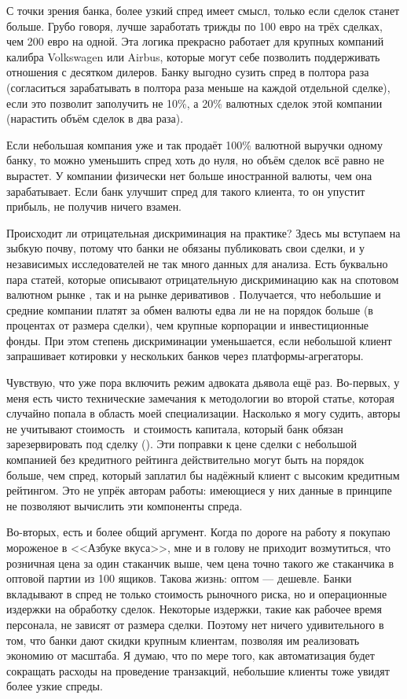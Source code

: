 С точки зрения банка, более узкий спред имеет смысл, только если сделок станет
больше. Грубо говоря, лучше заработать трижды по 100 евро на трёх сделках, чем
200 евро на одной. Эта логика прекрасно работает для крупных компаний калибра
Volkswagen или Airbus, которые могут себе позволить поддерживать отношения с
десятком дилеров. Банку выгодно сузить спред в полтора раза (согласиться
зарабатывать в полтора раза меньше на каждой отдельной сделке), если это
позволит заполучить не 10\%, а 20\% валютных сделок этой компании (нарастить
объём сделок в два раза).

Если небольшая компания уже и так продаёт 100\% валютной выручки одному банку,
то можно уменьшить спред хоть до нуля, но объём сделок всё равно не вырастет. У
компании физически нет больше иностранной валюты, чем она зарабатывает. Если
банк улучшит спред для такого клиента, то он упустит прибыль, не получив ничего
взамен.

Происходит ли отрицательная дискриминация на практике? Здесь мы вступаем на
зыбкую почву, потому что банки не обязаны публиковать свои сделки, и у
независимых исследователей не так много данных для анализа. Есть буквально пара
статей, которые описывают отрицательную дискриминацию как на спотовом валютном
рынке \cite{bjonnes2017}, так и на рынке деривативов \cite{hau2019}. Получается,
что небольшие и средние компании платят за обмен валюты едва ли не на порядок
больше (в процентах от размера сделки), чем крупные корпорации и инвестиционные
фонды. При этом степень дискриминации уменьшается, если небольшой клиент
запрашивает котировки у нескольких банков через платформы-агрегаторы.

Чувствую, что уже пора включить режим адвоката дьявола ещё раз. Во-первых, у
меня есть чисто технические замечания к методологии во второй статье, которая
случайно попала в область моей специализации. Насколько я могу судить, авторы не
учитывают стоимость \ и
стоимость капитала, который банк обязан зарезервировать под сделку (). Эти поправки к цене
сделки с небольшой компанией без кредитного рейтинга действительно могут быть на
порядок больше, чем спред, который заплатил бы надёжный клиент с высоким
кредитным рейтингом. Это не упрёк авторам работы: имеющиеся у них данные в
принципе не позволяют вычислить эти компоненты спреда.

Во-вторых, есть и более общий аргумент. Когда по дороге на работу я покупаю
мороженое в <<Азбуке вкуса>>, мне и в голову не приходит возмутиться, что
розничная цена за один стаканчик выше, чем цена точно такого же стаканчика в
оптовой партии из 100 ящиков. Такова жизнь: оптом --- дешевле. Банки вкладывают
в спред не только стоимость рыночного риска, но и операционные издержки на
обработку сделок. Некоторые издержки, такие как рабочее время персонала, не
зависят от размера сделки. Поэтому нет ничего удивительного в том, что банки
дают скидки крупным клиентам, позволяя им реализовать экономию от масштаба. Я
думаю, что по мере того, как автоматизация будет сокращать расходы на проведение
транзакций, небольшие клиенты тоже увидят более узкие спреды.

